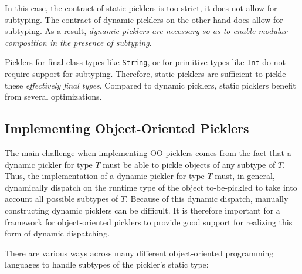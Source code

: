 \documentclass[preprint,10pt]{sigplanconf}
\theoremstyle{definition}
\theoremstyle{definition}
\newcommand{\term}[1]{\mbox{\texttt{#1}}}
\begin{document}
In this case, the contract of static picklers is too strict, it does not allow
for subtyping. The contract of dynamic picklers on the other hand does allow
for subtyping. As a result, {\em dynamic picklers are necessary so as to enable
modular composition in the presence of subtyping}.

Picklers for final class types like \term{String}, or for primitive types like
\term{Int} do not require support for subtyping. Therefore, static picklers
are sufficient to pickle these {\em effectively final types}. Compared to
dynamic picklers, static picklers benefit from several optimizations.

\subsection{Implementing Object-Oriented Picklers}

The main challenge when implementing OO picklers comes from the fact that a
dynamic pickler for type $T$ must be able to pickle objects of any subtype of
$T$. Thus, the implementation of a dynamic pickler for type $T$ must, in
general, dynamically dispatch on the runtime type of the object to-be-pickled
to take into account all possible subtypes of $T$. Because of this dynamic
dispatch, manually constructing dynamic picklers can be difficult. It is
therefore important for a framework for object-oriented picklers to provide
good support for realizing this form of dynamic dispatching.

There are various ways across many different object-oriented programming
languages to handle subtypes of the pickler's static type:
\end{document}
